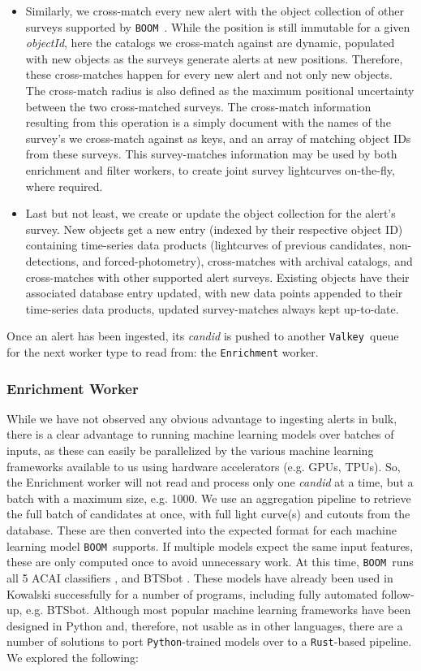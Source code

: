 \documentclass[twocolumn]{aastex631}
\newcommand{\boom}{\texttt{BOOM }}
\newcommand{\valkey}{\texttt{Valkey }}
\begin{document}
\begin{itemize}
\item Similarly, we cross-match every new alert with the object collection of other surveys supported by \boom. While the position is still immutable for a given \textit{objectId}, here the catalogs we cross-match against are dynamic, populated with new objects as the surveys generate alerts at new positions. Therefore, these cross-matches happen for every new alert and not only new objects. The cross-match radius is also defined as the maximum positional uncertainty between the two cross-matched surveys. The cross-match information resulting from this operation is a simply document with the names of the survey's we cross-match against as keys, and an array of matching object IDs from these surveys. This survey-matches information may be used by both enrichment and filter workers, to create joint survey lightcurves on-the-fly, where required.
\item Last but not least, we create or update the object collection for the alert's survey. New objects get a new entry (indexed by their respective object ID) containing time-series data products (lightcurves of previous candidates, non-detections, and forced-photometry), cross-matches with archival catalogs, and cross-matches with other supported alert surveys. Existing objects have their associated database entry updated, with new data points appended to their time-series data products, updated survey-matches always kept up-to-date.
\end{itemize}

Once an alert has been ingested, its \textit{candid} is pushed to another \valkey queue for the next worker type to read from: the \texttt{Enrichment} worker.

\subsubsection{Enrichment Worker}
\label{sec:enrichment}

While we have not observed any obvious advantage to ingesting alerts in bulk, there is a clear advantage to running machine learning models over batches of inputs, as these can easily be parallelized by the various machine learning frameworks available to us using hardware accelerators (e.g. GPUs, TPUs). So, the Enrichment worker will not read and process only one \textit{candid} at a time, but a batch with a maximum size, e.g. 1000. We use an aggregation pipeline to retrieve the full batch of candidates at once, with full light curve(s) and cutouts from the database. These are then converted into the expected format for each machine learning model \boom supports. If multiple models expect the same input features, these are only computed once to avoid unnecessary work. At this time, \boom runs all 5 ACAI classifiers \citep{Duev+2021}, and BTSbot \citep{Rehemtulla+2024}. These models have already been used in Kowalski successfully for a number of programs, including fully automated follow-up, e.g. BTSbot.
Although most popular machine learning frameworks have been designed in Python and, therefore, not usable as in other languages, there are a number of solutions to port \texttt{Python}-trained models over to a \texttt{Rust}-based pipeline. We explored the following:
\end{document}
